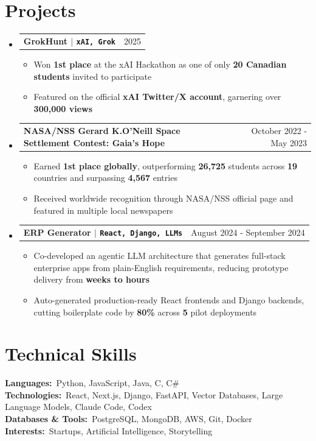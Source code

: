 \documentclass[letterpaper,10pt]{article}
\makeatletter
\newcommand{\resumeItem}[1]{
  \item\small{
    {#1 \vspace{-2pt}}
  }
}
\newcommand{\resumeProjectHeading}[2]{
    \item
    \begin{tabular*}{0.97\textwidth}{l@{\extracolsep{\fill}}r}
      \small#1 & #2 \\
    \end{tabular*}\vspace{-7pt}
}
\newcommand{\resumeSubHeadingListStart}{\begin{itemize}[leftmargin=0.15in, label={}]}
\newcommand{\resumeSubHeadingListEnd}{\end{itemize}}
\newcommand{\resumeItemListStart}{\begin{itemize}}
\newcommand{\resumeItemListEnd}{\end{itemize}\vspace{-5pt}}
\makeatother
\begin{document}
\section{Projects}
\resumeSubHeadingListStart
  \resumeProjectHeading
      {\textbf{GrokHunt $|$ \textup{\texttt{xAI, Grok}}}}{2025}
      \resumeItemListStart
        \resumeItem{Won \textbf{1st place} at the xAI Hackathon as one of only \textbf{20 Canadian students} invited to participate}
        \resumeItem{Featured on the official \textbf{xAI Twitter/X account}, garnering over \textbf{300{,}000 views}}
      \resumeItemListEnd
  \resumeProjectHeading
      {\textbf{NASA/NSS Gerard K.O'Neill Space Settlement Contest: Gaia's Hope}}{October 2022 - May 2023}
      \resumeItemListStart
        \resumeItem{Earned \textbf{1st place globally}, outperforming \textbf{26{,}725} students across \textbf{19} countries and surpassing \textbf{4{,}567} entries}
        \resumeItem{Received worldwide recognition through NASA/NSS official page and featured in multiple local newspapers}
      \resumeItemListEnd
  \resumeProjectHeading
      {\textbf{ERP Generator $|$ \textup{\texttt{React, Django, LLMs}}}}{August 2024 - September 2024}
      \resumeItemListStart
        \resumeItem{Co-developed an agentic LLM architecture that generates full-stack enterprise apps from plain-English requirements, reducing prototype delivery from \textbf{weeks to hours}}
        \resumeItem{Auto-generated production-ready React frontends and Django backends, cutting boilerplate code by \textbf{80\%} across \textbf{5} pilot deployments}
      \resumeItemListEnd
\resumeSubHeadingListEnd

\section{Technical Skills}
\begin{itemize}[leftmargin=0.15in, label={}]
   \small{\item{
    \textbf{Languages:}{\ Python, JavaScript, Java, C, C\#} \\
    \textbf{Technologies:}{\ React, Next.js, Django, FastAPI, Vector Databases, Large Language Models, Claude Code, Codex} \\
    \textbf{Databases \& Tools:}{\ PostgreSQL, MongoDB, AWS, Git, Docker} \\
    \textbf{Interests:}{\ Startups, Artificial Intelligence, Storytelling}
    }}
\end{itemize}
\end{document}
